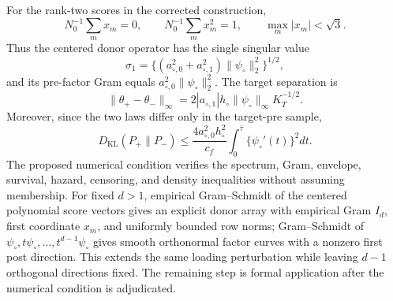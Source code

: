 For the rank-two scores in the corrected construction,
\[
 N_0^{-1}\sum_mx_m=0,\qquad N_0^{-1}\sum_mx_m^2=1,
 \qquad \max_m|x_m|<\sqrt3.
\]
Thus the centered donor operator has the single singular value
\[
 \sigma_1=\{(a_{\circ,0}^2+a_{\circ,1}^2)
 \|\psi_\circ\|_2^2\}^{1/2},
\]
and its pre-factor Gram equals \(a_{\circ,0}^2\|\psi_\circ\|_2^2\).  The target separation is
\[
 \|\theta_+-\theta_-\|_\infty
 =2|a_{\circ,1}|h_\circ\|\psi_\circ\|_\infty K_T^{-1/2}.
\]
Moreover, since the two laws differ only in the target-pre sample,
\[
 D_{\mathrm{KL}}(P_+\|P_-)
 \le \frac{4a_{\circ,0}^2h_\circ^2}{c_f}
 \int_0^{\bar\tau}\{\psi_\circ'(t)\}^2dt.
\]
The proposed numerical condition verifies the spectrum, Gram, envelope, survival, hazard, censoring, and density inequalities without assuming membership.  For fixed \(d>1\), empirical Gram--Schmidt of the centered polynomial score vectors gives an explicit donor array with empirical Gram \(I_d\), first coordinate \(x_m\), and uniformly bounded row norms; Gram--Schmidt of \(\psi_\circ,t\psi_\circ,\ldots,t^{d-1}\psi_\circ\) gives smooth orthonormal factor curves with a nonzero first post direction.  This extends the same loading perturbation while leaving \(d-1\) orthogonal directions fixed.  The remaining step is formal application after the numerical condition is adjudicated.